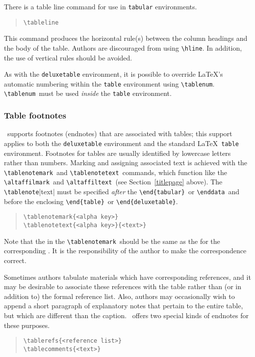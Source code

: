 \documentclass[preprint2]{aastex}
\begin{document}
There is a table line command for use in \texttt{tabular} 
environments. 
\begin{quote} 
\verb"\tableline" 
 \end{quote} 
This command produces the horizontal rule(s) between the column headings 
and the body of the table. 
Authors are discouraged from using \verb"\hline". 
In addition, the use of vertical rules should be avoided. 
 
As with the \texttt{deluxetable} environment, it 
 is possible to override \LaTeX's automatic numbering within the 
\texttt{table} environment using \verb"\tablenum". 
\verb"\tablenum"\ 
 must be used \emph{inside} the \texttt{table} 
environment. 
 
 
 
\subsubsection{Table footnotes} \label{tabfoot} 
 
\aastex\ supports footnotes (endnotes) that are associated with tables; 
this support applies to both the 
\texttt{deluxetable}  environment 
and the standard \LaTeX\ \texttt{table} environment. 
Footnotes for tables are usually identified by lowercase letters 
rather than num\-bers. 
Marking and assigning associated text is achieved with 
the \verb"\tablenotemark"\ 
 and \verb"\tablenotetext"\ 
 commands, which function like the  \verb"\altaffilmark"\ 
 and \verb"\altaffiltext"\ 
 (see Section~\ref{titlepage} above). 
The \verb"\tablenote"\-|text| 
 must be specified 
\emph{after} the \verb"\end{tabular}"\  or \verb"\enddata"\  and before 
the enclosing \verb"\end{table}"\  or \verb"\end{deluxetable}". 
\begin{quote} 
\begin{verbatim} 
\tablenotemark{<alpha key>} 
\tablenotetext{<alpha key>}{<text>} 
\end{verbatim} 
\end{quote} 
Note that the  in the \verb"\tablenotemark"\ 
should be the same as the 
\m{alpha key} for the corresponding . 
It is the responsibility of the author to make the correspondence 
correct. 
 
Sometimes authors tabulate materials which have corresponding 
references, 
and it may be desirable to associate these references with the table 
rather than (or in addition to) the formal reference list. 
Also, authors may occasionally wish to append a 
short paragraph of explanatory 
notes that pertain to the entire table, but which are different than 
the caption. \aastex\ offers two special kinds of endnotes for these 
purposes. 
\begin{quote} 
\begin{verbatim} 
\tablerefs{<reference list>} 
\tablecomments{<text>} 
\end{verbatim} 
\end{quote} 
 
\end{document}
